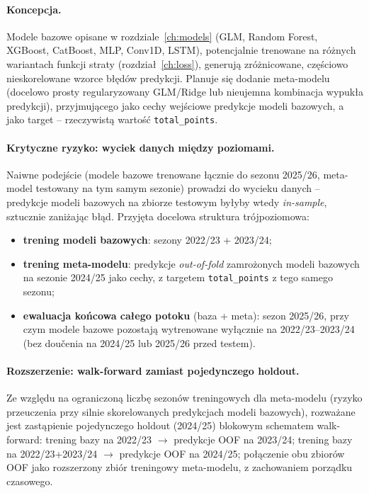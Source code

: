\documentclass[a4paper,twoside,11pt]{mwrep}
\theoremstyle{plain} \newtheorem{thm}{Twierdzenie}
\theoremstyle{plain} \newtheorem{lem}{Lemat}
\theoremstyle{definition} \newtheorem{defn}{Definicja}
\theoremstyle{remark} \newtheorem*{rem}{Wniosek}
\begin{document}
\paragraph{Koncepcja.}
Modele bazowe opisane w rozdziale~\ref{ch:models} (GLM, Random Forest,
XGBoost, CatBoost, MLP, Conv1D, LSTM), potencjalnie trenowane na różnych
wariantach funkcji straty (rozdział~\ref{ch:loss}), generują zróżnicowane,
częściowo nieskorelowane wzorce błędów predykcji. Planuje się dodanie
meta-modelu (docelowo prosty regularyzowany GLM/Ridge lub nieujemna
kombinacja wypukła predykcji), przyjmującego jako cechy wejściowe
predykcje modeli bazowych, a jako target -- rzeczywistą wartość
\texttt{total\_points}.

\paragraph{Krytyczne ryzyko: wyciek danych między poziomami.}
Naiwne podejście (modele bazowe trenowane łącznie do sezonu 2025/26,
meta-model testowany na tym samym sezonie) prowadzi do wycieku danych --
predykcje modeli bazowych na zbiorze testowym byłyby wtedy \emph{in-sample},
sztucznie zaniżając błąd. Przyjęta docelowa struktura trójpoziomowa:

\begin{itemize}
    \item \textbf{trening modeli bazowych}: sezony 2022/23 + 2023/24;
    \item \textbf{trening meta-modelu}: predykcje \emph{out-of-fold}
    zamrożonych modeli bazowych na sezonie 2024/25 jako cechy, z targetem
    \texttt{total\_points} z tego samego sezonu;
    \item \textbf{ewaluacja końcowa całego potoku} (baza + meta): sezon
    2025/26, przy czym modele bazowe pozostają wytrenowane wyłącznie na
    2022/23--2023/24 (bez doučenia na 2024/25 lub 2025/26 przed testem).
\end{itemize}

\paragraph{Rozszerzenie: walk-forward zamiast pojedynczego holdout.}
Ze względu na ograniczoną liczbę sezonów treningowych dla meta-modelu
(ryzyko przeuczenia przy silnie skorelowanych predykcjach modeli
bazowych), rozważane jest zastąpienie pojedynczego holdout (2024/25)
blokowym schematem walk-forward: trening bazy na 2022/23 $\rightarrow$
predykcje OOF na 2023/24; trening bazy na 2022/23+2023/24
$\rightarrow$ predykcje OOF na 2024/25; połączenie obu zbiorów OOF jako
rozszerzony zbiór treningowy meta-modelu, z zachowaniem porządku
czasowego.
\end{document}
